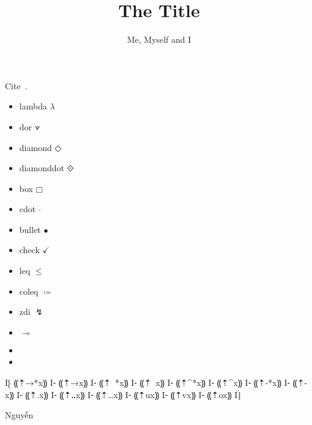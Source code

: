 \documentclass{article}
\title{The Title}
\author{Me, Myself and I}
\begin{document}
\maketitle

Cite~\citep{darais-icfp17}.

\begin{itemize}
   \item lambda $λ$ 
   \item dor $⟇$
   \item diamond $◇$
   \item diamonddot $⟐$
   \item box $□$
   \item cdot $⋅$
   \item bullet $•$
   \item check $✓$
   \item leq $≤$
   \item coleq $≔ $
   \item zdi $↯$
   \item $⊸$
\end{itemize}

\begin{itemize}
  \item \lipsum[1-2]
  \item \lipsum[2-4]
\end{itemize}

I⁅ ⸨⇡→*{x}⸩
I⁃ ⸨⇡→{x}⸩
I⁃ ⸨⇡~*{x}⸩
I⁃ ⸨⇡~{x}⸩
I⁃ ⸨⇡^*{x}⸩
I⁃ ⸨⇡^{x}⸩
I⁃ ⸨⇡-*{x}⸩
I⁃ ⸨⇡-{x}⸩
I⁃ ⸨⇡.{x}⸩
I⁃ ⸨⇡‥{x}⸩
I⁃ ⸨⇡…{x}⸩
I⁃ ⸨⇡u{x}⸩
I⁃ ⸨⇡v{x}⸩
I⁃ ⸨⇡o{x}⸩
I⁆

Nguyễn



\end{document}

